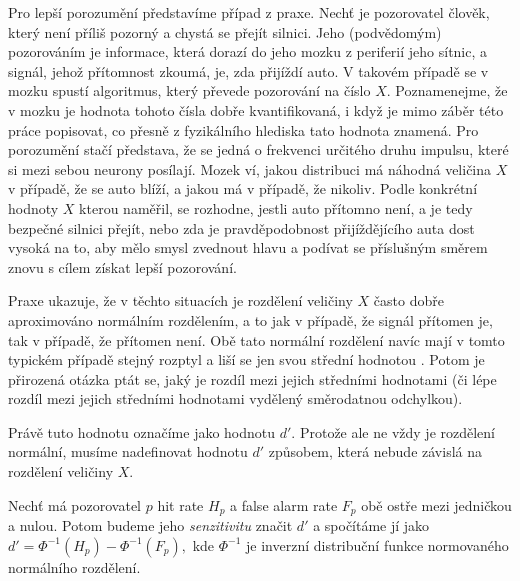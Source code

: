 Pro lepší porozumění představíme případ z praxe. Nechť je pozorovatel člověk, který není
příliš pozorný a chystá se přejít silnici. Jeho (podvědomým) pozorováním je
informace, která dorazí do jeho mozku z periferií jeho sítnic, a signál, jehož
přítomnost zkoumá, je, zda přijíždí auto. V takovém případě se v mozku spustí
algoritmus, který převede pozorování na číslo $X$. Poznamenejme, že v mozku je
hodnota tohoto čísla dobře kvantifikovaná, i když je mimo záběr této práce
popisovat, co přesně z fyzikálního hlediska tato hodnota znamená. Pro
porozumění stačí představa, že se jedná o frekvenci určitého druhu impulsu,
které si mezi sebou neurony posílají. Mozek ví, jakou distribuci má náhodná
veličina $X$ v případě, že se auto blíží, a jakou má v případě, že nikoliv.
Podle konkrétní hodnoty $X$ kterou naměřil, se rozhodne, jestli auto přítomno
není, a je tedy bezpečné silnici přejít, nebo zda je pravděpodobnost
přijíždějícího auta dost vysoká na to, aby mělo smysl zvednout hlavu a podívat
se příslušným směrem znovu s cílem získat lepší pozorování.

Praxe ukazuje, že v těchto situacích je rozdělení veličiny $X$ často dobře
aproximováno normálním rozdělením, a to jak v případě, že signál přítomen je,
tak v případě, že přítomen není. Obě tato normální rozdělení navíc mají v tomto
typickém případě stejný rozptyl a liší se jen svou střední hodnotou \citep{SwetsSDT}. Potom je
přirozená otázka ptát se, jaký je rozdíl mezi jejich středními hodnotami (či lépe
rozdíl mezi jejich středními hodnotami vydělený směrodatnou odchylkou).

Právě tuto hodnotu označíme jako hodnotu $d'$. Protože ale ne vždy je rozdělení
normální, musíme nadefinovat hodnotu $d'$ způsobem, která nebude závislá na rozdělení
veličiny $X$.

\begin{definice}\label{dprime}
Nechť má pozorovatel $p$ hit rate $H_p$ a false alarm rate $F_p$ obě ostře mezi jedničkou a nulou. Potom budeme jeho \emph{senzitivitu}
značit $d'$ a spočítáme jí jako $d' = \Phi^{-1}(H_p) - \Phi^{-1}(F_p),$ kde $\Phi^{-1}$ je inverzní distribuční funkce normovaného normálního rozdělení.
\end{definice}

